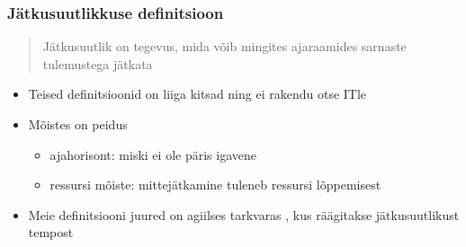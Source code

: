 \begin{frame}[fragile]
  \frametitle{Jätkusuutlikkuse definitsioon}
  \begin{center}
  	\begin{quote}
		Jätkusuutlik on tegevus, mida võib mingites ajaraamides sarnaste tulemustega jätkata 
	\end{quote}
  \end{center}

	\begin{itemize}
		\item Teised definitsioonid on liiga kitsad ning ei rakendu otse ITle
		\item Mõistes on peidus 
		\begin{itemize}
			\item ajahorisont: miski ei ole päris igavene
			\item ressursi mõiste: mittejätkamine tuleneb ressursi lõppemisest
		\end{itemize}
		
		\item Meie definitsiooni juured on agiilses tarkvaras \citep{sustainable}, kus räägitakse jätkusuutlikust tempost
	\end{itemize}
\end{frame}

